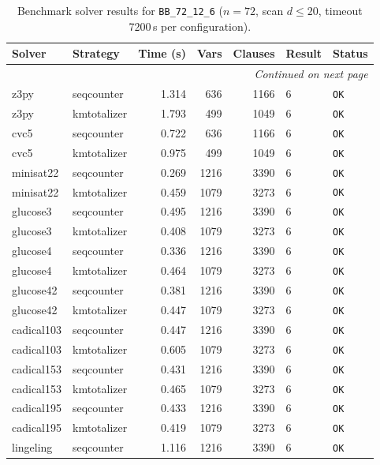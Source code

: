 \begin{longtable}{llrrrl p{}}
\caption{Benchmark solver results for \texttt{BB\_72\_12\_6} ($n=72$, scan $d \leq 20$, timeout 7200\,s per configuration).} \label{tab:bench-BB_72_12_6} \\
\toprule
Solver & Strategy & Time (s) & Vars & Clauses & Result & Status \\
\midrule
\endhead
\midrule
\multicolumn{7}{r}{\textit{Continued on next page}} \\
\midrule
\endfoot
\bottomrule
\endlastfoot
z3py & seqcounter & 1.314 & 636 & 1166 & 6 & \texttt{OK} \\
z3py & kmtotalizer & 1.793 & 499 & 1049 & 6 & \texttt{OK} \\
cvc5 & seqcounter & 0.722 & 636 & 1166 & 6 & \texttt{OK} \\
cvc5 & kmtotalizer & 0.975 & 499 & 1049 & 6 & \texttt{OK} \\
minisat22 & seqcounter & 0.269 & 1216 & 3390 & 6 & \texttt{OK} \\
minisat22 & kmtotalizer & 0.459 & 1079 & 3273 & 6 & \texttt{OK} \\
glucose3 & seqcounter & 0.495 & 1216 & 3390 & 6 & \texttt{OK} \\
glucose3 & kmtotalizer & 0.408 & 1079 & 3273 & 6 & \texttt{OK} \\
glucose4 & seqcounter & 0.336 & 1216 & 3390 & 6 & \texttt{OK} \\
glucose4 & kmtotalizer & 0.464 & 1079 & 3273 & 6 & \texttt{OK} \\
glucose42 & seqcounter & 0.381 & 1216 & 3390 & 6 & \texttt{OK} \\
glucose42 & kmtotalizer & 0.447 & 1079 & 3273 & 6 & \texttt{OK} \\
cadical103 & seqcounter & 0.447 & 1216 & 3390 & 6 & \texttt{OK} \\
cadical103 & kmtotalizer & 0.605 & 1079 & 3273 & 6 & \texttt{OK} \\
cadical153 & seqcounter & 0.431 & 1216 & 3390 & 6 & \texttt{OK} \\
cadical153 & kmtotalizer & 0.465 & 1079 & 3273 & 6 & \texttt{OK} \\
cadical195 & seqcounter & 0.433 & 1216 & 3390 & 6 & \texttt{OK} \\
cadical195 & kmtotalizer & 0.419 & 1079 & 3273 & 6 & \texttt{OK} \\
lingeling & seqcounter & 1.116 & 1216 & 3390 & 6 & \texttt{OK} \\

\end{longtable}
